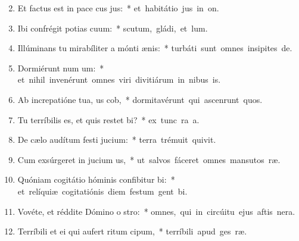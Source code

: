 \begin{flushleft}
\begin{enumerate}[leftmargin=*]
\setcounter{enumi}{1}

\item Et factus est in pace cus jus:~* \mbox{et habitátio jus in on.}
\item Ibi confrégit potias cuum:~* \mbox{scutum, gládi, et lum.}
\item Illúminans tu mirabíliter a mónti ænis:~* \mbox{turbáti sunt omnes insipites de.}
\item Dormiérunt num um:~* \mbox{et nihil invenérunt omnes viri divitiárum in nibus is.}
\item Ab increpatióne tua, us cob,~* \mbox{dormitavérunt qui ascenrunt quos.}
\item Tu terríbilis es, et quis restet bi?~* \mbox{ex tunc ra a.}
\item De cælo audítum festi jucium:~* \mbox{terra trémuit  quivit.}
\item Cum exsúrgeret in jucium us,~* \mbox{ut salvos fáceret omnes mansutos ræ.}
\item Quóniam cogitátio hóminis confibitur bi:~* \mbox{et relíquiæ cogitatiónis diem festum gent bi.}
\item Vovéte, et réddite Dómino o stro:~* \mbox{omnes, qui in circúitu ejus aftis nera.}
\item Terríbili et ei qui aufert ritum cipum,~* \mbox{terríbili apud ges ræ.}

\end{enumerate}
\end{flushleft}

